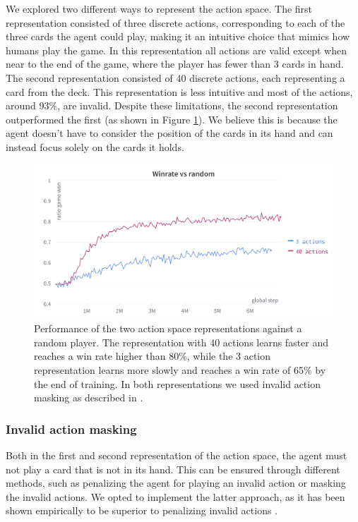 We explored two different ways to represent the action space. The first representation consisted of three discrete actions, corresponding to each of the three cards the agent could play, making it an intuitive choice that mimics how humans play the game. In this representation all actions are valid except when near to the end of the game, where the player has fewer than 3 cards in hand. The second representation consisted of 40 discrete actions, each representing a card from the deck. This representation is less intuitive and most of the actions, around 93\%, are invalid. Despite these limitations, the second representation outperformed the first (as shown in Figure \ref{fig:action-space-comparison}). We believe this is because the agent doesn't have to consider the position of the cards in its hand and can instead focus solely on the cards it holds.
\begin{figure}[H]
    \centering
    \includegraphics[width=\textwidth]{images/action-spaces-comparison.png}
    \caption{Performance of the two action space representations against a random player. The representation with 40 actions learns faster and reaches a win rate higher than 80\%, while the 3 action representation learns more slowly and reaches a win rate of 65\% by the end of training. In both representations we used invalid action masking as described in \cite{action-masking}.}
    \label{fig:action-space-comparison}
\end{figure}

\subsubsection{Invalid action masking}
Both in the first and second representation of the action space, the agent must not play a card that is not in its hand. This can be ensured through different methods, such as penalizing the agent for playing an invalid action or masking the invalid actions. We opted to implement the latter approach, as it has been shown empirically to be superior to penalizing invalid actions \cite{action-masking}.

